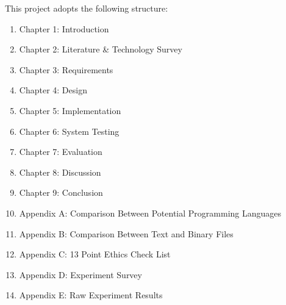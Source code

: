 This project adopts the following structure:

\begin{enumerate}
    \item Chapter 1: Introduction
    \item Chapter 2: Literature \& Technology Survey
    \item Chapter 3: Requirements
    \item Chapter 4: Design
    \item Chapter 5: Implementation
    \item Chapter 6: System Testing
    \item Chapter 7: Evaluation
    \item Chapter 8: Discussion
    \item Chapter 9: Conclusion
    \item Appendix A: Comparison Between Potential Programming Languages
    \item Appendix B: Comparison Between Text and Binary Files
    \item Appendix C: 13 Point Ethics Check List
    \item Appendix D: Experiment Survey
    \item Appendix E: Raw Experiment Results
\end{enumerate}
